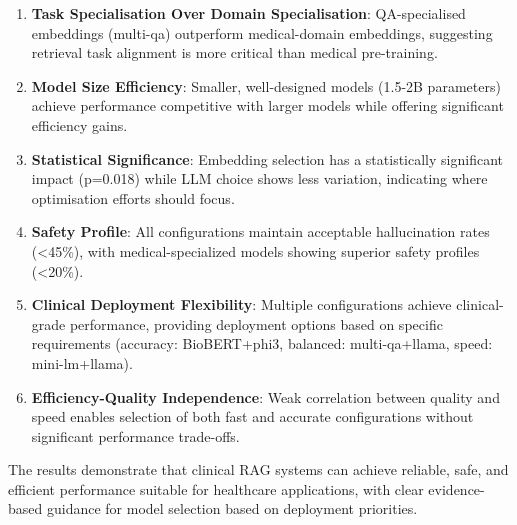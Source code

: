 \begin{enumerate}
    \item \textbf{Task Specialisation Over Domain Specialisation}: QA-specialised embeddings (multi-qa) outperform medical-domain embeddings, suggesting retrieval task alignment is more critical than medical pre-training.

    \item \textbf{Model Size Efficiency}: Smaller, well-designed models (1.5-2B parameters) achieve performance competitive with larger models while offering significant efficiency gains.

    \item \textbf{Statistical Significance}: Embedding selection has a statistically significant impact (p=0.018) while LLM choice shows less variation, indicating where optimisation efforts should focus.

    \item \textbf{Safety Profile}: All configurations maintain acceptable hallucination rates (\textless45\%), with medical-specialized models showing superior safety profiles (\textless20\%).

    \item \textbf{Clinical Deployment Flexibility}: Multiple configurations achieve clinical-grade performance, providing deployment options based on specific requirements (accuracy: BioBERT+phi3, balanced: multi-qa+llama, speed: mini-lm+llama).

    \item \textbf{Efficiency-Quality Independence}: Weak correlation between quality and speed enables selection of both fast and accurate configurations without significant performance trade-offs.
\end{enumerate}

The results demonstrate that clinical RAG systems can achieve reliable, safe, and efficient performance suitable for healthcare applications, with clear evidence-based guidance for model selection based on deployment priorities.
